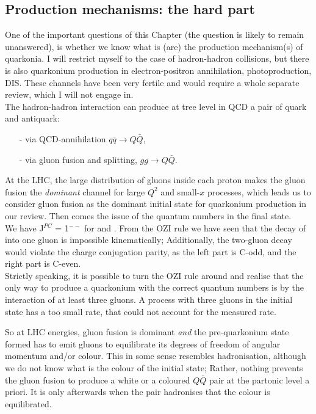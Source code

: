 \subsection{Production mechanisms: the hard part}
\label{sec:models}
One of the important questions of this Chapter (the question is likely to remain
unanswered), is whether we know what is (are) the production
mechanism(s) of quarkonia. 
I will restrict myself to the case of hadron-hadron collisions, but
there is also quarkonium production in electron-positron annihilation,
photoproduction, DIS. These channels have been very fertile and would require a whole separate
review, which I will not engage in.
\\
The hadron-hadron interaction can produce at tree level in QCD a pair of quark and
antiquark:
\begin{itemize}
\item[-] via QCD-annihilation $q\bar{q} \to Q\bar{Q}$,
\item[-] via gluon fusion and splitting, $gg \to Q\bar{Q}$.
\end{itemize}
 At the LHC, the large distribution of gluons inside each proton makes the gluon
 fusion the \textit{dominant} channel for large $Q^{2}$ and small-$x$ processes, which leads us to consider gluon
 fusion as the dominant initial state for quarkonium production in our
 review. Then comes the issue of the quantum
 numbers in the final state.
\\
We have J$^{PC}$ = 1$^{--}$ for \Jpsi and \PgU. From the OZI rule we
have seen that the decay of \Jpsi into one gluon is impossible
kinematically; Additionally, the two-gluon decay would
violate the charge conjugation parity, as the left part is C-odd, and
the right part is C-even.
\\
Strictly speaking, it is possible to turn the OZI rule around and
realise that the only way to produce a quarkonium with the correct
quantum numbers is by the
interaction of at least three gluons. A process with three gluons in the initial state
has a too small rate, that could not account for the measured
\Jpsi rate.

So at LHC energies, gluon fusion is dominant \textit{and} the
pre-quarkonium state formed has to emit gluons to equilibrate its
degrees of freedom of angular momentum and/or colour. This in some sense resembles
hadronisation, although we do not know what is the colour of the initial
state; Rather, nothing prevents the gluon fusion to produce a white or
a coloured $Q\bar{Q}$ pair at the partonic level a priori. It is only
afterwards when the pair hadronises that the colour is
equilibrated.


